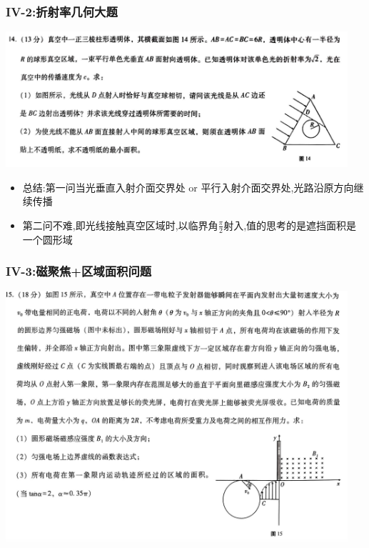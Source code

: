 \documentclass{article}
\begin{document}
\vspace{2em}


\subsubsection{IV-2:折射率几何大题}
\includegraphics[width=0.95\textwidth,keepaspectratio]{./pictures/3.1-5.png}

\begin{itemize}
    \item 总结:第一问当光垂直入射介面交界处 or 平行入射介面交界处,光路沿原方向继续传播
    \item 第二问不难,即光线接触真空区域时,以临界角$\frac{\pi}{2}$射入,值的思考的是遮挡面积是一个圆形域
\end{itemize}

\vspace{2em}

\subsubsection{IV-3:磁聚焦+区域面积问题}
\includegraphics[width=0.95\textwidth,keepaspectratio]{./pictures/3.1-6.png}
\end{document}
